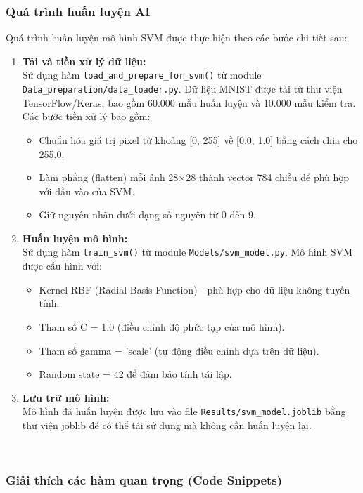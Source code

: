 \documentclass[../DoAn.tex]{subfiles}
\begin{document}
\subsubsection{Quá trình huấn luyện AI}

Quá trình huấn luyện mô hình SVM được thực hiện theo các bước chi tiết sau:

\begin{enumerate}
    \item \textbf{Tải và tiền xử lý dữ liệu:} \\Sử dụng hàm \texttt{load\_and\_prepare\_for\_svm()} từ module \texttt{Data\_preparation/data\_loader.py}. Dữ liệu MNIST được tải từ thư viện TensorFlow/Keras, bao gồm 60.000 mẫu huấn luyện và 10.000 mẫu kiểm tra. Các bước tiền xử lý bao gồm:
    \begin{itemize}
        \item Chuẩn hóa giá trị pixel từ khoảng [0, 255] về [0.0, 1.0] bằng cách chia cho 255.0.
        \item Làm phẳng (flatten) mỗi ảnh 28×28 thành vector 784 chiều để phù hợp với đầu vào của SVM.
        \item Giữ nguyên nhãn dưới dạng số nguyên từ 0 đến 9.
    \end{itemize}
    
    \item \textbf{Huấn luyện mô hình:} \\Sử dụng hàm \texttt{train\_svm()} từ module \texttt{Models/svm\_model.py}. Mô hình SVM được cấu hình với:
    \begin{itemize}
        \item Kernel RBF (Radial Basis Function) - phù hợp cho dữ liệu không tuyến tính.
        \item Tham số C = 1.0 (điều chỉnh độ phức tạp của mô hình).
        \item Tham số gamma = 'scale' (tự động điều chỉnh dựa trên dữ liệu).
        \item Random state = 42 để đảm bảo tính tái lập.
    \end{itemize}
    
    \item \textbf{Lưu trữ mô hình:} \\Mô hình đã huấn luyện được lưu vào file \texttt{Results/svm\_model.joblib} bằng thư viện joblib để có thể tái sử dụng mà không cần huấn luyện lại.
    
\end{enumerate}
\\
\subsubsection{Giải thích các hàm quan trọng (Code Snippets)}
\end{document}

